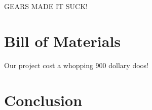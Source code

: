 \documentclass[11pt]{ieeeconf}
\begin{document}
GEARS MADE IT SUCK!

\section{Bill of Materials}

Our project cost a whopping 900 dollary doos!

\section{Conclusion}



\end{document}
